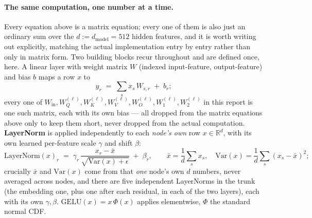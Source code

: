 \documentclass[11pt,a4paper]{article}
\begin{document}
\paragraph{The same computation, one number at a time.} Every equation above is a matrix
equation; every one of them is also just an ordinary sum over the $d:=d_{\mathrm{model}}=512$
hidden features, and it is worth writing out explicitly, matching the actual implementation
entry by entry rather than only in matrix form. Two building blocks recur throughout and are
defined once, here. A linear layer with weight matrix $W$ (indexed input-feature, output-feature)
and bias $b$ maps a row $x$ to
\[ y_r \;=\; \sum_{s} x_s\,W_{s,r} \;+\; b_r; \]
every one of $W_{\mathrm{in}}, W_Q^{(\ell)}, W_K^{(\ell)}, W_V^{(\ell)}, W_O^{(\ell)}, W_1^{(\ell)},
W_2^{(\ell)}$ in this report is one such matrix, each with its own bias --- all dropped from the
matrix equations above only to keep them short, never dropped from the actual computation.
\textbf{LayerNorm} is applied independently to each \emph{node's own} row $x\in\mathbb R^d$, with
its own learned per-feature scale $\gamma$ and shift $\beta$:
\[ \mathrm{LayerNorm}(x)_r \;=\; \gamma_r\,\frac{x_r-\bar x}{\sqrt{\mathrm{Var}(x)+\epsilon}} \;+\; \beta_r,
\qquad \bar x=\frac1d\sum_{s} x_s,\quad \mathrm{Var}(x)=\frac1d\sum_{s}(x_s-\bar x)^2; \]
crucially $\bar x$ and $\mathrm{Var}(x)$ come from that \emph{one} node's own $d$ numbers, never
averaged across nodes, and there are five independent LayerNorms in the trunk (the embedding one,
plus one after each residual, in each of the two layers), each with its own $\gamma,\beta$.
$\mathrm{GELU}(x)=x\,\Phi(x)$ applies elementwise, $\Phi$ the standard normal CDF.
\end{document}
